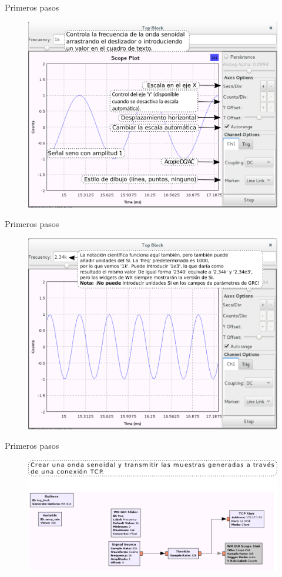\begin{frame}{Primeros pasos }
\begin{figure}[H]
\centering
\includegraphics[width=\textwidth, height=0.55\textwidth]{parte1/lab1/pdf/lab1_19.pdf}
\end{figure}
\end{frame}

\begin{frame}{Primeros pasos }
\begin{figure}[H]
\centering
\includegraphics[width=\textwidth, height=0.55\textwidth]{parte1/lab1/pdf/lab1_20.pdf}
\end{figure}
\end{frame}

\begin{frame}{Primeros pasos }
\begin{figure}[H]
\centering
\includegraphics[width=\textwidth]{parte1/lab1/pdf/lab1_21.pdf}
\end{figure}
\end{frame}

